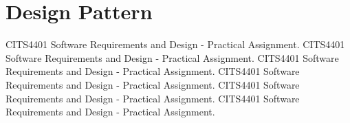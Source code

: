 \section{Design Pattern}

\par
CITS4401 Software Requirements and Design - Practical Assignment.
CITS4401 Software Requirements and Design - Practical Assignment.
CITS4401 Software Requirements and Design - Practical Assignment.
CITS4401 Software Requirements and Design - Practical Assignment.
CITS4401 Software Requirements and Design - Practical Assignment.
CITS4401 Software Requirements and Design - Practical Assignment.
